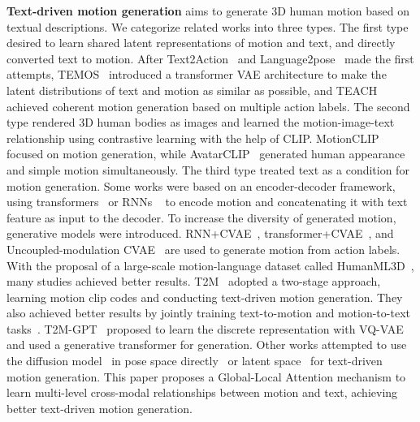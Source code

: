 \documentclass[10pt,twocolumn,letterpaper]{article}
\begin{document}
\textbf{Text-driven motion generation}
aims to generate 3D human motion based on textual descriptions. We categorize related works into three types. The first type desired to learn shared latent representations of motion and text, and directly converted text to motion. After Text2Action~\cite{ahn2018text2action} and Language2pose~\cite{ahuja2019language2pose} made the first attempts, TEMOS~\cite{petrovich2022temos} introduced a transformer VAE architecture to make the latent distributions of text and motion as similar as possible, and TEACH~\cite{athanasiou2022teach} achieved coherent motion generation based on multiple action labels. The second type rendered 3D human bodies as images and learned the motion-image-text relationship using contrastive learning with the help of CLIP. MotionCLIP~\cite{tevet2022motionclip} focused on motion generation, while AvatarCLIP~\cite{hong2022avatarclip} generated human appearance and simple motion simultaneously.  The third type treated text as a condition for motion generation. Some works were based on an encoder-decoder framework, using transformers~\cite{bhattacharya2021text2gestures} or RNNs ~\cite{Lin2018GeneratingAV} to encode motion and concatenating it with text feature as input to the decoder. To increase the diversity of generated motion, generative models were introduced. RNN+CVAE~\cite{guo2020action2motion}, transformer+CVAE~\cite{petrovich2021action}, and Uncoupled-modulation CVAE~\cite{zhong2022learning} are used to generate motion from action labels. With the proposal of a large-scale motion-language dataset called HumanML3D~\cite{guo2022generating}, many studies achieved better results. T2M~\cite{guo2022generating} adopted a two-stage approach, learning motion clip codes and conducting text-driven motion generation. They also achieved better results by jointly training text-to-motion and motion-to-text tasks~\cite{guo2022tm2t}. T2M-GPT~\cite{zhang2023t2m} proposed to learn the discrete representation with VQ-VAE and used a generative transformer for generation. Other works attempted to use the diffusion model~\cite{ho2020denoising} in pose space directly~\cite{zhang2022motiondiffuse,tevet2023human} or latent space~\cite{chen2023mld} for text-driven motion generation. This paper proposes a Global-Local Attention mechanism to learn multi-level cross-modal relationships between motion and text, achieving better text-driven motion generation.
\end{document}
